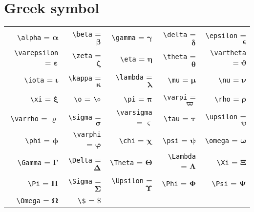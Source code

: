 \documentclass[11pt,a4paper]{article}
\begin{document}
\section{Greek symbol}
\begin{tabular}[htp]{rrrrr}
	\verb|\alpha| = $\bm{\alpha}$ & \verb|\beta| = $\bm{\beta}$ & \verb|\gamma| = $\bm{\gamma}$ & \verb|\delta| = $\bm{\delta}$ & \verb|\epsilon| = $\bm{\epsilon}$ \\
	\verb|\varepsilon| = $\bm{\varepsilon}$ & \verb|\zeta| = $\bm{\zeta}$ & \verb|\eta| = $\bm{\eta}$ & \verb|\theta| = $\bm{\theta}$ & \verb|\vartheta| = $\bm{\vartheta}$ \\
	\verb|\iota| = $\bm{\iota}$ & \verb|\kappa| = $\bm{\kappa}$ & \verb|\lambda| = $\bm{\lambda}$ & \verb|\mu| = $\bm{\mu}$ & \verb|\nu| = $\bm{\nu}$ \\
	\verb|\xi| = $\bm{\xi}$ & \verb|\o| = $\bm{\o}$ & \verb|\pi| = $\bm{\pi}$ &	\verb|\varpi| = $\bm{\varpi}$ & \verb|\rho| = $\bm{\rho}$ \\
	\verb|\varrho| = $\bm{\varrho}$ & \verb|\sigma| = $\bm{\sigma}$ & \verb|\varsigma| = $\bm{\varsigma}$ & \verb|\tau| = $\bm{\tau}$ & \verb|\upsilon| = $\bm{\upsilon}$ \\
	\verb|\phi| = $\bm{\phi}$ & \verb|\varphi| = $\bm{\varphi}$ & \verb|\chi| = $\bm{\chi}$ & \verb|\psi| = $\bm{\psi}$ & \verb|\omega| = $\bm{\omega}$ \\
	\verb|\Gamma| = $\bm{\Gamma}$ & \verb|\Delta| = $\bm{\Delta}$ &	\verb|\Theta| = $\bm{\Theta}$ & \verb|\Lambda| = $\bm{\Lambda}$ & \verb|\Xi| = $\bm{\Xi}$ \\
	\verb|\Pi| = $\bm{\Pi}$ & \verb|\Sigma| = $\bm{\Sigma}$ & \verb|\Upsilon| = $\bm{\Upsilon}$ & \verb|\Phi| = $\bm{\Phi}$ & \verb|\Psi| = $\bm{\Psi}$ \\
	\verb|\Omega| = $\bm{\Omega}$ & \verb|\$| = $\bm{\$}$ \\
	\hline
\end{tabular}
\end{document}
